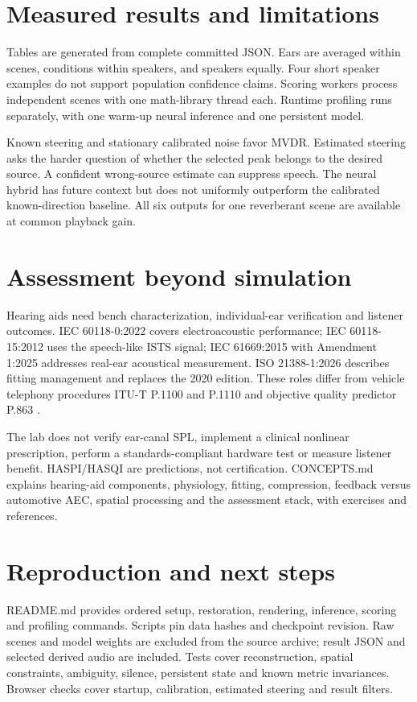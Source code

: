 \documentclass[10pt,a4paper]{article}
\begin{document}
\section{Measured results and limitations}
Tables are generated from complete committed JSON. Ears are averaged within scenes, conditions within speakers, and speakers equally. Four short speaker examples do not support population confidence claims. Scoring workers process independent scenes with one math-library thread each. Runtime profiling runs separately, with one warm-up neural inference and one persistent model.





Known steering and stationary calibrated noise favor MVDR. Estimated steering asks the harder question of whether the selected peak belongs to the desired source. A confident wrong-source estimate can suppress speech. The neural hybrid has future context but does not uniformly outperform the calibrated known-direction baseline. All six outputs for one reverberant scene are available at common playback gain.

\section{Assessment beyond simulation}
Hearing aids need bench characterization, individual-ear verification and listener outcomes. IEC 60118-0:2022 covers electroacoustic performance; IEC 60118-15:2012 uses the speech-like ISTS signal; IEC 61669:2015 with Amendment 1:2025 addresses real-ear acoustical measurement. ISO 21388-1:2026 describes fitting management and replaces the 2020 edition. These roles differ from vehicle telephony procedures ITU-T P.1100 and P.1110 and objective quality predictor P.863 \cite{iec,iso,itu}.

The lab does not verify ear-canal SPL, implement a clinical nonlinear prescription, perform a standards-compliant hardware test or measure listener benefit. HASPI/HASQI are predictions, not certification. CONCEPTS.md explains hearing-aid components, physiology, fitting, compression, feedback versus automotive AEC, spatial processing and the assessment stack, with exercises and references.

\section{Reproduction and next steps}
README.md provides ordered setup, restoration, rendering, inference, scoring and profiling commands. Scripts pin data hashes and checkpoint revision. Raw scenes and model weights are excluded from the source archive; result JSON and selected derived audio are included. Tests cover reconstruction, spatial constraints, ambiguity, silence, persistent state and known metric invariances. Browser checks cover startup, calibration, estimated steering and result filters.
\end{document}

